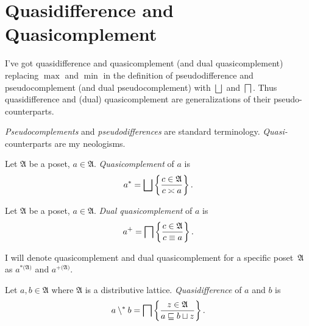 \section{Quasidifference and Quasicomplement}

I've got quasidifference and quasicomplement (and dual quasicomplement)
replacing $\max$ and $\min$ in the definition of pseudodifference
and pseudocomplement (and dual pseudocomplement) with $\bigsqcup$
and $\bigsqcap$. Thus quasidifference and (dual) quasicomplement
are generalizations of their pseudo- counterparts.
\begin{rem}
\emph{Pseudocomplements} and \emph{pseudodifferences} are standard
terminology. \emph{Quasi-} counterparts are my neologisms.\end{rem}
\begin{defn}
Let $\mathfrak{A}$ be a poset, $a\in\mathfrak{A}$.
\emph{Quasicomplement} of $a$ is
\[
a^{\ast}=\bigsqcup\left\{ \frac{c\in\mathfrak{A}}{c\asymp a}\right\}.
\]

\end{defn}

\begin{defn}
Let $\mathfrak{A}$ be a poset, $a\in\mathfrak{A}$.
\emph{Dual quasicomplement} of $a$ is
\[
a^{+}=\bigsqcap\left\{ \frac{c\in\mathfrak{A}}{c\equiv a}\right\}.
\]

\end{defn}
I will denote quasicomplement and dual quasicomplement for a specific
poset~$\mathfrak{A}$ as $a^{\ast(\mathfrak{A)}}$ and $a^{+(\mathfrak{A)}}$.
\begin{defn}
Let $a,b\in\mathfrak{A}$ where $\mathfrak{A}$
is a distributive lattice. \emph{Quasidifference} of $a$ and $b$
is
\[
a\setminus^{\ast} b=\bigsqcap\left\{ \frac{z\in\mathfrak{A}}{a\sqsubseteq b\sqcup z}\right\}.
\]

\end{defn}

